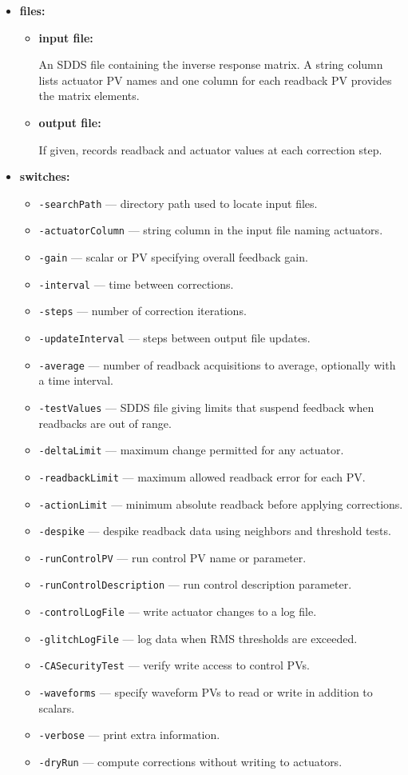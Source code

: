 \begin{itemize}
\item {\bf files:}
  \begin{itemize}
  \item {\bf input file:} \par
    An SDDS file containing the inverse response matrix. A string column lists actuator PV names and one column for each readback PV provides the matrix elements.
  \item {\bf output file:} \par
    If given, records readback and actuator values at each correction step.
  \end{itemize}

\item {\bf switches:}
  \begin{itemize}
  \item {\tt -searchPath} --- directory path used to locate input files.
  \item {\tt -actuatorColumn} --- string column in the input file naming actuators.
  \item {\tt -gain} --- scalar or PV specifying overall feedback gain.
  \item {\tt -interval} --- time between corrections.
  \item {\tt -steps} --- number of correction iterations.
  \item {\tt -updateInterval} --- steps between output file updates.
  \item {\tt -average} --- number of readback acquisitions to average, optionally with a time interval.
  \item {\tt -testValues} --- SDDS file giving limits that suspend feedback when readbacks are out of range.
  \item {\tt -deltaLimit} --- maximum change permitted for any actuator.
  \item {\tt -readbackLimit} --- maximum allowed readback error for each PV.
  \item {\tt -actionLimit} --- minimum absolute readback before applying corrections.
  \item {\tt -despike} --- despike readback data using neighbors and threshold tests.
  \item {\tt -runControlPV} --- run control PV name or parameter.
  \item {\tt -runControlDescription} --- run control description parameter.
  \item {\tt -controlLogFile} --- write actuator changes to a log file.
  \item {\tt -glitchLogFile} --- log data when RMS thresholds are exceeded.
  \item {\tt -CASecurityTest} --- verify write access to control PVs.
  \item {\tt -waveforms} --- specify waveform PVs to read or write in addition to scalars.
  \item {\tt -verbose} --- print extra information.
  \item {\tt -dryRun} --- compute corrections without writing to actuators.
  \end{itemize}


\end{itemize}
